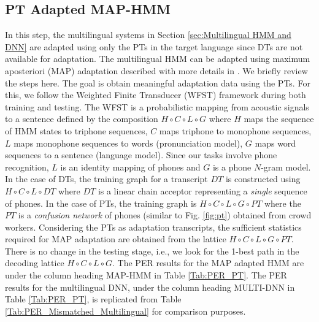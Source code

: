 \documentclass[a4paper]{article}
\begin{document}
\subsection{PT Adapted MAP-HMM}
\label{sec:PT Adapted MAP-HMM}
In this step, the multilingual systems in Section \ref{sec:Multilingual HMM and DNN} are adapted using only the PTs in the target language since DTs are not available for adaptation. The multilingual HMM can be adapted using maximum aposteriori (MAP) adaptation described with more details in \cite{Liu-PTAdaptedGMM}. We briefly review the steps here. The goal is obtain meaningful adaptation data using the PTs. For this, we follow the Weighted Finite Transducer (WFST)\cite{Mohri-WFST} framework during both training and testing. The WFST is a probabilistic mapping from acoustic signals to a sentence defined by the composition $H \circ C \circ L \circ G$ where $H$ maps the sequence of HMM states to triphone sequences, $C$ maps triphone to monophone sequences, $L$ maps monophone sequences to words (pronunciation model), $G$ maps word sequences to a sentence (language model). Since our tasks involve phone recognition, $L$ is an identity mapping of phones and $G$ is a phone $N$-gram model. In the case of DTs, the training graph for a transcript $DT$ is constructed using $H \circ C \circ L \circ DT$ where $DT$ is a linear chain acceptor representing a \emph{single} sequence of phones. In the case of PTs, the training graph is $H \circ C \circ L \circ G \circ PT$ where the $PT$ is a \emph{confusion network} of phones (similar to Fig. \ref{fig:pt}) obtained from crowd workers. Considering the PTs as adaptation transcripts, the sufficient statistics required for MAP adaptation are obtained from the lattice  $H \circ C \circ L \circ G \circ PT$. There is no change in the testing stage, i.e., we look for the 1-best path in the decoding lattice $H \circ C \circ L \circ G$. The PER results for the MAP adapted HMM are under the column heading MAP-HMM in Table \ref{Tab:PER_PT}. The PER results for the multilingual DNN, under the column heading MULTI-DNN in Table \ref{Tab:PER_PT}, is replicated from Table \ref{Tab:PER_Mismatched_Multilingual} for comparison purposes.
\end{document}
